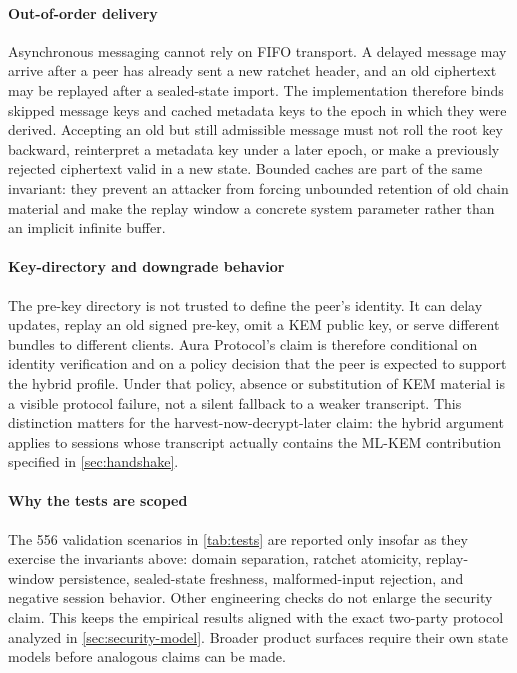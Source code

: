 \documentclass[preprint,12pt]{elsarticle}
\theoremstyle{definition}
\begin{document}
\paragraph{Out-of-order delivery}
Asynchronous messaging cannot rely on FIFO transport. A delayed message
may arrive after a peer has already sent a new ratchet header, and an old
ciphertext may be replayed after a sealed-state import. The implementation
therefore binds skipped message keys and cached metadata keys to the
epoch in which they were derived. Accepting an old but still admissible
message must not roll the root key backward, reinterpret a metadata key
under a later epoch, or make a previously rejected ciphertext valid in a
new state. Bounded caches are part of the same invariant: they prevent an
attacker from forcing unbounded retention of old chain material and make
the replay window a concrete system parameter rather than an implicit
infinite buffer.

\paragraph{Key-directory and downgrade behavior}
The pre-key directory is not trusted to define the peer's identity. It can
delay updates, replay an old signed pre-key, omit a KEM public key, or
serve different bundles to different clients. Aura Protocol's claim is therefore
conditional on identity verification and on a policy decision that the
peer is expected to support the hybrid profile. Under that policy,
absence or substitution of KEM material is a visible protocol failure, not
a silent fallback to a weaker transcript. This distinction matters for
the harvest-now-decrypt-later claim: the hybrid argument applies to
sessions whose transcript actually contains the ML-KEM contribution
specified in \cref{sec:handshake}.

\paragraph{Why the tests are scoped}
The 556 validation scenarios in \cref{tab:tests} are reported only insofar as
they exercise the invariants above: domain separation, ratchet atomicity,
replay-window persistence, sealed-state freshness, malformed-input rejection,
and negative session behavior. Other engineering checks do not enlarge the
security claim. This keeps the empirical results aligned with the exact
two-party protocol analyzed in \cref{sec:security-model}. Broader product
surfaces require their own state models before analogous claims can be made.
\end{document}
